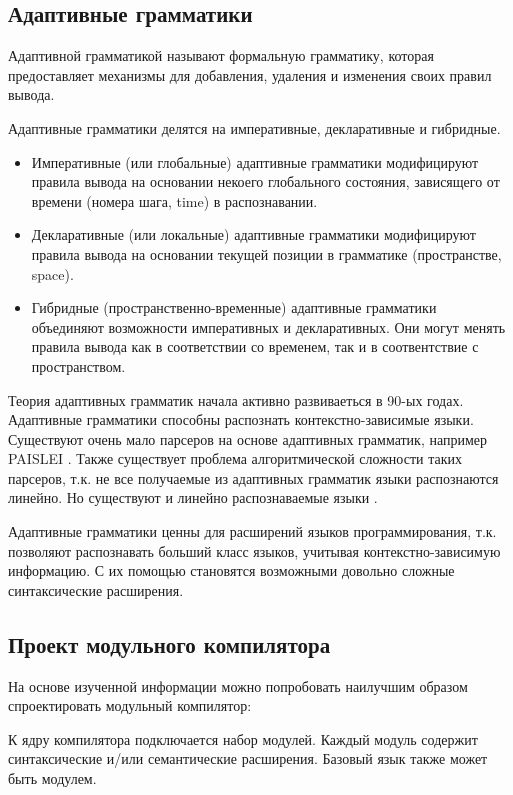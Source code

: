 \documentclass[a4paper,12pt,titlepage]{extarticle}
\begin{document}
\subsection{Адаптивные грамматики}
\label{adaptive}
Адаптивной грамматикой называют формальную грамматику, которая предоставляет
механизмы для добавления, удаления и изменения своих правил вывода.

Адаптивные грамматики делятся на императивные, декларативные и гибридные.
\begin{itemize}
  \item Императивные (или глобальные) адаптивные грамматики модифицируют правила
  вывода на основании некоего глобального состояния, зависящего от времени
  (номера шага, time) в распознавании.
  \item Декларативные (или локальные) адаптивные грамматики модифицируют правила
  вывода на основании текущей позиции в грамматике (пространстве, space).
  \item Гибридные (пространственно-временные) адаптивные грамматики объединяют
  возможности императивных и декларативных. Они могут менять правила вывода как
  в соответствии со временем, так и в соотвентствие с пространством.
\end{itemize}

Теория адаптивных грамматик начала активно развиваеться в 90-ых годах.
Адаптивные грамматики способны распознать контекстно-зависимые языки.
Существуют очень мало парсеров на основе адаптивных грамматик, например PAISLEI
\cite{paislei}. Также существует проблема алгоритмической сложности таких
парсеров, т.к. не все получаемые из адаптивных грамматик языки распознаются
линейно. Но существуют и линейно распознаваемые языки \cite{paislei}.

Адаптивные грамматики ценны для расширений языков программирования, т.к.
позволяют распознавать больший класс языков, учитывая контекстно-зависимую
информацию. С их помощью становятся возможными довольно сложные синтаксические
расширения.

\subsection{Проект модульного компилятора}
На основе изученной информации можно попробовать наилучшим образом
спроектировать модульный компилятор:

К ядру компилятора подключается набор модулей. Каждый модуль содержит
синтаксические и/или семантические расширения. Базовый язык также может быть
модулем.
\end{document}
